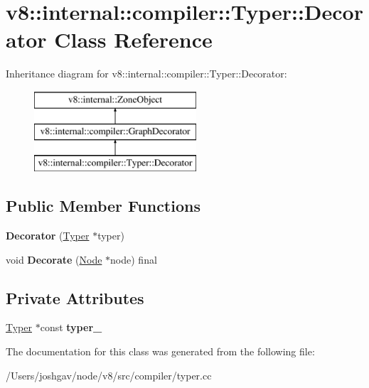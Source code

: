 \hypertarget{classv8_1_1internal_1_1compiler_1_1_typer_1_1_decorator}{}\section{v8\+:\+:internal\+:\+:compiler\+:\+:Typer\+:\+:Decorator Class Reference}
\label{classv8_1_1internal_1_1compiler_1_1_typer_1_1_decorator}
Inheritance diagram for v8\+:\+:internal\+:\+:compiler\+:\+:Typer\+:\+:Decorator\+:\begin{figure}[H]
\begin{center}
\leavevmode
\includegraphics[height=3.000000cm]{classv8_1_1internal_1_1compiler_1_1_typer_1_1_decorator}
\end{center}
\end{figure}
\subsection*{Public Member Functions}
\begin{DoxyCompactItemize}
\item 
{\bfseries Decorator} (\hyperlink{classv8_1_1internal_1_1compiler_1_1_typer}{Typer} $\ast$typer)\hypertarget{classv8_1_1internal_1_1compiler_1_1_typer_1_1_decorator_ac58f3ef557f8688066edac72f05040ee}{}\label{classv8_1_1internal_1_1compiler_1_1_typer_1_1_decorator_ac58f3ef557f8688066edac72f05040ee}

\item 
void {\bfseries Decorate} (\hyperlink{classv8_1_1internal_1_1compiler_1_1_node}{Node} $\ast$node) final\hypertarget{classv8_1_1internal_1_1compiler_1_1_typer_1_1_decorator_a1a7053547003779a009aab5f01524155}{}\label{classv8_1_1internal_1_1compiler_1_1_typer_1_1_decorator_a1a7053547003779a009aab5f01524155}

\end{DoxyCompactItemize}
\subsection*{Private Attributes}
\begin{DoxyCompactItemize}
\item 
\hyperlink{classv8_1_1internal_1_1compiler_1_1_typer}{Typer} $\ast$const {\bfseries typer\+\_\+}\hypertarget{classv8_1_1internal_1_1compiler_1_1_typer_1_1_decorator_a033b72f34e34bbaab427f2ad56b03880}{}\label{classv8_1_1internal_1_1compiler_1_1_typer_1_1_decorator_a033b72f34e34bbaab427f2ad56b03880}

\end{DoxyCompactItemize}


The documentation for this class was generated from the following file\+:\begin{DoxyCompactItemize}
\item 
/\+Users/joshgav/node/v8/src/compiler/typer.\+cc\end{DoxyCompactItemize}
